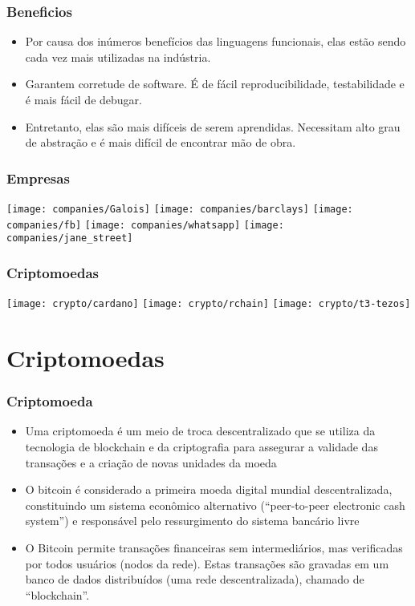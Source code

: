 \documentclass{beamer}
\begin{document}
\begin{frame}
  \frametitle{Beneficios}
  \begin{itemize}
    \item Por causa dos inúmeros benefícios das linguagens funcionais,
      elas estão sendo cada vez mais utilizadas na indústria.
    \item Garantem corretude de software.
      É de fácil reproducibilidade, testabilidade e é mais fácil de debugar.
    \item Entretanto, elas são mais difíceis de serem aprendidas.
      Necessitam alto grau de abstração e
      é mais difícil de encontrar mão de obra.
  \end{itemize}
\end{frame}

\begin{frame}
  \frametitle{Empresas}
    \texttt{[image: companies/Galois]}
    \texttt{[image: companies/barclays]}
    \texttt{[image: companies/fb]}
    \texttt{[image: companies/whatsapp]}
    \texttt{[image: companies/jane\_street]}
\end{frame}

\begin{frame}
  \frametitle{Criptomoedas}
    \texttt{[image: crypto/cardano]}
    \texttt{[image: crypto/rchain]}
    \texttt{[image: crypto/t3-tezos]}
\end{frame}

\section{Criptomoedas}

\begin{frame}
  \frametitle{Criptomoeda}
\begin{itemize}
    \item Uma criptomoeda é um meio de troca descentralizado que se utiliza da tecnologia de blockchain e da criptografia para assegurar a validade das transações e a criação de novas unidades da moeda
    \item O bitcoin é considerado a primeira moeda digital mundial descentralizada, constituindo um sistema econômico alternativo (\foreignquote{english}{peer-to-peer electronic cash system}) e responsável pelo ressurgimento do sistema bancário livre
      \cite{nakamoto2008bitcoin}
    \item O Bitcoin permite transações financeiras sem intermediários, mas verificadas por todos usuários (nodos da rede). Estas transações são gravadas em um banco de dados distribuídos (uma rede descentralizada), chamado de \foreignquote{english}{blockchain}.
    \end{itemize}
\end{frame}
\end{document}
